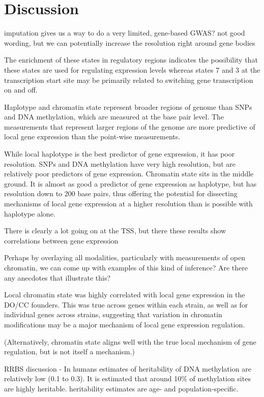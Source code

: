 \documentclass[10pt,letterpaper]{article}
\begin{document}
\hypertarget{discussion}{%
\section{Discussion}\label{discussion}}

imputation gives us a way to do a very limited, gene-based GWAS? not
good wording, but we can potentially increase the resolution right
around gene bodies

The enrichment of these states in regulatory regions indicates the
possibility that these states are used for regulating expression levels
whereas states 7 and 3 at the transcription start site may be primarily
related to switching gene transcription on and off.

Haplotype and chromatin state represent broader regions of genome than
SNPs and DNA methylation, which are measured at the base pair level. The
measurements that represent larger regions of the genome are more
predictive of local gene expression than the point-wise measurements.

While local haplotype is the best predictor of gene expression, it has
poor resolution. SNPs and DNA methylation have very high resolution, but
are relatively poor predictors of gene expression. Chromatin state sits
in the middle ground. It is almost as good a predictor of gene
expression as haplotype, but has resolution down to 200 base pairs, thus
offering the potential for dissecting mechanisms of local gene
expression at a higher resolution than is possible with haplotype alone.

There is clearly a lot going on at the TSS, but there these results show
correlations between gene expression

Perhaps by overlaying all modalities, particularly with measurements of
open chromatin, we can come up with examples of this kind of inference?
Are there any anecdotes that illustrate this?

Local chromatin state was highly correlated with local gene expression
in the DO/CC founders. This was true across genes within each strain, as
well as for individual genes across strains, suggesting that variation
in chromatin modifications may be a major mechanism of local gene
expression regulation.

(Alternatively, chromatin state aligns well with the true local
mechanism of gene regulation, but is not itself a mechanism.)

RRBS discussion - In humans estimates of heritability of DNA methylation
are relatively low (0.1 to 0.3). It is estimated that around 10\% of
methylation sites are highly heritable. heritability estimates are age-
and population-specific.
\end{document}
